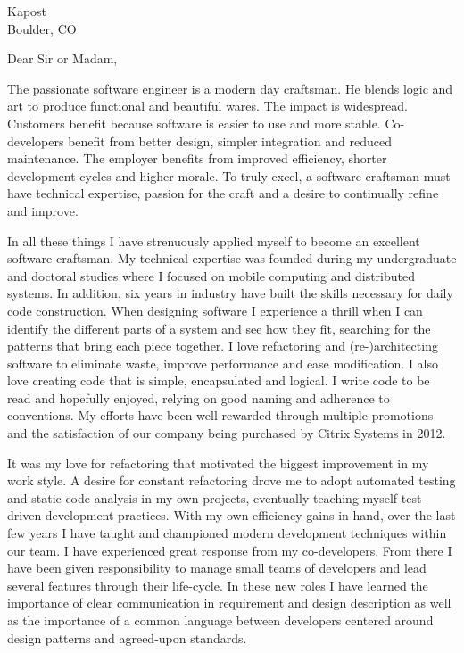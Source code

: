 \documentclass{letter}
\date{}
\begin{document}
\address{Nathanael Thompson\\1102 Lincolnshire Drive\\Champaign, IL 61821\\nat@alumni.brown.edu\\(469)
230-7125 (mobile)}
\signature{Nathanael Thompson}
\begin{letter}{Kapost\\Boulder, CO}

\opening{Dear Sir or Madam,}
The passionate software engineer is a modern day craftsman.  He
blends logic and art to produce functional and beautiful wares.
The impact is widespread.  Customers benefit because software is
easier to use and more stable.  Co-developers benefit from better
design, simpler integration and reduced maintenance.  The employer
benefits from improved efficiency, shorter development cycles and
higher morale.  To truly excel, a software craftsman must have
technical expertise, passion for the craft and a desire to continually
refine and improve.

In all these things I have strenuously applied myself to become an
excellent software craftsman.  My technical expertise was founded
during my undergraduate and doctoral studies where I focused on
mobile computing and distributed systems.  In addition, six years
in industry have built the skills necessary for daily code construction.
When designing software I experience a thrill when I can identify
the different parts of a system and see how they fit, searching for
the patterns that bring each piece together.  I love refactoring
and (re-)architecting software to eliminate waste, improve performance
and ease modification.  I also love creating code that is simple,
encapsulated and logical.  I write code to be read and hopefully
enjoyed, relying on good naming and adherence to conventions.  My
efforts have been well-rewarded through multiple promotions and the
satisfaction of our company being purchased by Citrix Systems in
2012.

It was my love for refactoring that motivated the biggest improvement
in my work style.  A desire for constant refactoring drove me to
adopt automated testing and static code analysis in my own projects,
eventually teaching myself test-driven development practices.  With
my own efficiency gains in hand, over the last few years I have
taught and championed modern development techniques within our team.
I have experienced great response from my co-developers.  From there
I have been given responsibility to manage small teams of developers
and lead several features through their life-cycle.  In these new
roles I have learned the importance of clear communication in
requirement and design description as well as the importance of a
common language between developers centered around design patterns
and agreed-upon standards.


\end{letter}
\end{document}
